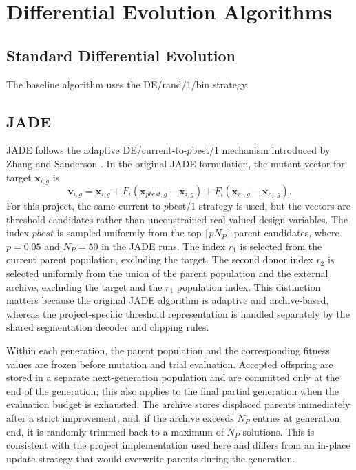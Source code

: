 \documentclass[review]{elsarticle}
\begin{document}

\section{Differential Evolution Algorithms}
\label{sec:algorithms}


\subsection{Standard Differential Evolution}

The baseline algorithm uses the DE/rand/1/bin strategy.



\subsection{JADE}
\label{sec:jade}

JADE follows the adaptive DE/current-to-$p$best/1 mechanism introduced by Zhang and Sanderson \citep{zhang2009jade}. In the original JADE formulation, the mutant vector for target $\mathbf{x}_{i,g}$ is
\begin{equation}
\mathbf{v}_{i,g}
=
\mathbf{x}_{i,g}
+ F_i(\mathbf{x}_{pbest,g}-\mathbf{x}_{i,g})
+ F_i(\mathbf{x}_{r_1,g}-\mathbf{x}_{r_2,g}).
\end{equation}
For this project, the same current-to-$p$best/1 strategy is used, but the vectors are threshold candidates rather than unconstrained real-valued design variables. The index $pbest$ is sampled uniformly from the top $\lceil p N_P \rceil$ parent candidates, where $p=0.05$ and $N_P=50$ in the JADE runs. The index $r_1$ is selected from the current parent population, excluding the target. The second donor index $r_2$ is selected uniformly from the union of the parent population and the external archive, excluding the target and the $r_1$ population index. This distinction matters because the original JADE algorithm is adaptive and archive-based, whereas the project-specific threshold representation is handled separately by the shared segmentation decoder and clipping rules.

Within each generation, the parent population and the corresponding fitness values are frozen before mutation and trial evaluation. Accepted offspring are stored in a separate next-generation population and are committed only at the end of the generation; this also applies to the final partial generation when the evaluation budget is exhausted. The archive stores displaced parents immediately after a strict improvement, and, if the archive exceeds $N_P$ entries at generation end, it is randomly trimmed back to a maximum of $N_P$ solutions. This is consistent with the project implementation used here and differs from an in-place update strategy that would overwrite parents during the generation.
\end{document}
